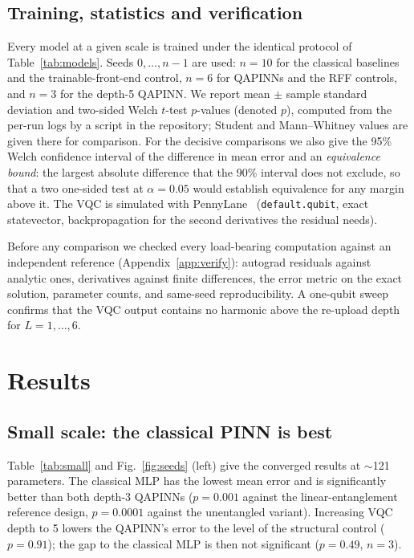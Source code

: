 \documentclass[11pt]{article}
\begin{document}
\subsection{Training, statistics and verification}
Every model at a given scale is trained under the identical protocol of
Table~\ref{tab:models}. Seeds $0,\dots,n-1$ are used: $n=10$ for the classical
baselines and the trainable-front-end control, $n=6$ for QAPINNs and the RFF controls,
and $n=3$ for the depth-5 QAPINN.
We report mean $\pm$ sample standard deviation and two-sided Welch $t$-test $p$-values
(denoted $p$), computed from the per-run logs by a script in the repository; Student
and Mann--Whitney values are given there for comparison. For the decisive comparisons
we also give the 95\% Welch confidence interval of the difference in mean error and an
\emph{equivalence bound}: the largest absolute difference that the 90\% interval does
not exclude, so that a two one-sided test at $\alpha=0.05$ would establish equivalence
for any margin above it. The VQC is simulated with
PennyLane~\cite{pennylane} (\texttt{default.qubit}, exact statevector, backpropagation
for the second derivatives the residual needs).

Before any comparison we checked every load-bearing computation against an
independent reference (Appendix~\ref{app:verify}): autograd residuals against analytic
ones, derivatives against finite differences, the error metric on the exact solution,
parameter counts, and same-seed reproducibility. A one-qubit sweep confirms that the
VQC output contains no harmonic above the re-upload depth for $L=1,\dots,6$.

\section{Results}
\subsection{Small scale: the classical PINN is best}\label{sec:small}
Table~\ref{tab:small} and Fig.~\ref{fig:seeds} (left) give the converged results at
$\sim$121 parameters. The classical MLP has the lowest mean error and is significantly
better than both depth-3 QAPINNs ($p=0.001$ against the linear-entanglement reference
design, $p=0.0001$ against the unentangled variant). Increasing VQC depth to 5 lowers
the QAPINN's error to the level of the structural control ($p=0.91$); the gap to the
classical MLP is then not significant ($p=0.49$, $n=3$).
\end{document}
